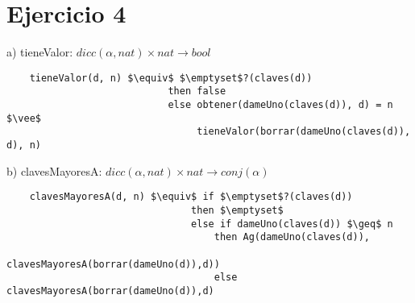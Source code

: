 \section*{Ejercicio 4}

a) tieneValor: $dicc(\alpha, nat) \times nat \rightarrow bool$
\begin{lstlisting}
    tieneValor(d, n) $\equiv$ $\emptyset$?(claves(d))
                            then false
                            else obtener(dameUno(claves(d)), d) = n $\vee$ 
                                 tieneValor(borrar(dameUno(claves(d)), d), n)
\end{lstlisting}

b) clavesMayoresA: $dicc(\alpha, nat) \times nat \rightarrow conj(\alpha)$
\begin{lstlisting}
    clavesMayoresA(d, n) $\equiv$ if $\emptyset$?(claves(d))
                                then $\emptyset$
                                else if dameUno(claves(d)) $\geq$ n
                                    then Ag(dameUno(claves(d)), 
                                            clavesMayoresA(borrar(dameUno(d)),d))
                                    else clavesMayoresA(borrar(dameUno(d)),d)
\end{lstlisting}